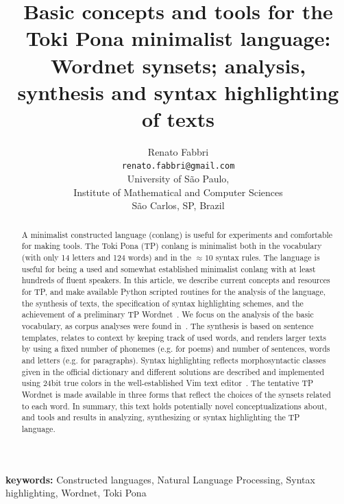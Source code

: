 \documentclass{article}
\begin{document}
\title{Basic concepts and tools for the Toki Pona minimalist language:
Wordnet synsets; analysis, synthesis and syntax highlighting of texts}
\author{Renato Fabbri\\
\texttt{renato.fabbri@gmail.com}\\
University of São Paulo,\\
Institute of Mathematical and Computer Sciences\\
São Carlos, SP, Brazil
}
\maketitle
\begin{abstract}
  A minimalist constructed language (conlang)
  is useful for experiments and comfortable for making tools.
  The Toki Pona (TP) conlang is minimalist both in the vocabulary
  (with only 14 letters and 124 words)
  and in the $\approx10$ syntax rules.
  The language is useful for being a used and somewhat established
  minimalist conlang with at least hundreds of fluent speakers.
  In this article, we describe current concepts and resources
  for TP,
  and make available Python scripted routines for
  the analysis of the language,
  the synthesis of texts, the specification of syntax highlighting
  schemes, and the achievement of a preliminary TP
  Wordnet~\cite{wordnet}.
  We focus on the analysis of the basic vocabulary,
  as corpus analyses were found in~\cite{corpus}.
  The synthesis is based on sentence templates,
  relates to context by keeping track of used words,
  and renders larger texts by using a fixed number of phonemes (e.g. for poems)
  and number of sentences, words and letters (e.g. for paragraphs).
  Syntax highlighting 
  reflects morphosyntactic classes given in the official dictionary
  and different solutions are described and implemented
  using 24bit true colors in the well-established Vim text editor~\cite{vim}.
  The tentative TP Wordnet is made available in three forms that
  reflect the choices of the synsets related to each word.
  In summary, this text holds potentially novel conceptualizations about,
  and tools and results in analyzing, synthesizing or syntax highlighting the
  TP language.
\end{abstract}
{\bf keywords:} Constructed languages, Natural Language Processing, Syntax highlighting, Wordnet, Toki Pona
\end{document}
